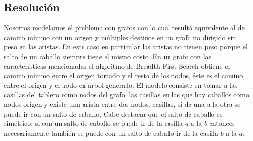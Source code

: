 \subsection{Resolución}
Nosotros modelamos el problema con grafos con lo cual resultó equivalente al de camino mínimo 
con un origen y múltiples destinos en un grafo no dirigido sin peso en las aristas. 
En este caso en particular las aristas no tienen peso porque el salto de un caballo siempre 
tiene el mismo costo. En un grafo con las características mencionadas el algoritmo de 
Breadth First Search \cite[p.~594]{cormen} obtiene el camino mínimo entre el origen tomado y el resto de los nodos,
éste es el camino entre el origen y el nodo en árbol generado.
El modelo consiste en tomar a las casillas del tablero como nodos del grafo, las casillas en las que 
hay caballos como nodos origen y existe una arista entre dos nodos, casillas, si de una a la otra se
puede ir con un salto de caballo. Cabe destacar que el salto de caballo es simétrico: si con un salto
de caballo se puede ir de la casilla $a$ a la $b$ entonces necesariamente también se puede con un 
salto de caballo ir de la casilla $b$ a la $a$:\\
